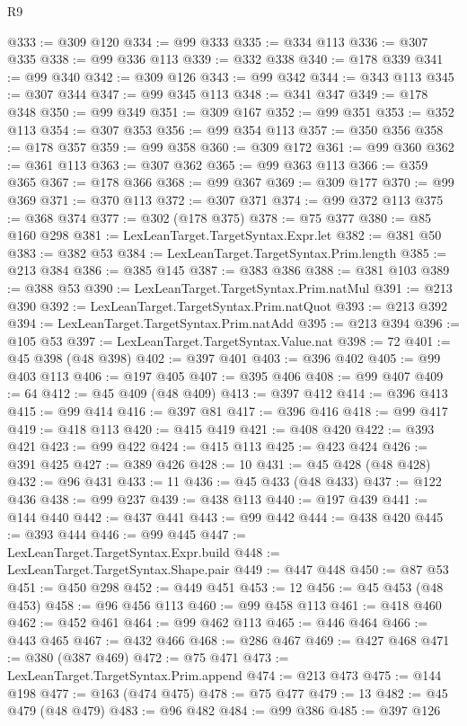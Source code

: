 \begin{lexlean}{R9}
\begin{coremodule}
{{{{{{{{{{{{{{{{{{{{{{{{{{{{{{{{{{{{{{{{{{{{{{{{{{{{{{{{{{{{{{{{{{{{{{{{{{{{{{{{{{{{@333 := @309 @120
@334 := @99 @333
@335 := @334 @113
@336 := @307 @335
@338 := @99 @336 @113
@339 := @332 @338
@340 := @178 @339
@341 := @99 @340
@342 := @309 @126
@343 := @99 @342
@344 := @343 @113
@345 := @307 @344
@347 := @99 @345 @113
@348 := @341 @347
@349 := @178 @348
@350 := @99 @349
@351 := @309 @167
@352 := @99 @351
@353 := @352 @113
@354 := @307 @353
@356 := @99 @354 @113
@357 := @350 @356
@358 := @178 @357
@359 := @99 @358
@360 := @309 @172
@361 := @99 @360
@362 := @361 @113
@363 := @307 @362
@365 := @99 @363 @113
@366 := @359 @365
@367 := @178 @366
@368 := @99 @367
@369 := @309 @177
@370 := @99 @369
@371 := @370 @113
@372 := @307 @371
@374 := @99 @372 @113
@375 := @368 @374
@377 := @302 (@178 @375)
@378 := @75 @377
@380 := @85 @160 @298
@381 := LexLeanTarget.TargetSyntax.Expr.let
@382 := @381 @50
@383 := @382 @53
@384 := LexLeanTarget.TargetSyntax.Prim.length
@385 := @213 @384
@386 := @385 @145
@387 := @383 @386
@388 := @381 @103
@389 := @388 @53
@390 := LexLeanTarget.TargetSyntax.Prim.natMul
@391 := @213 @390
@392 := LexLeanTarget.TargetSyntax.Prim.natQuot
@393 := @213 @392
@394 := LexLeanTarget.TargetSyntax.Prim.natAdd
@395 := @213 @394
@396 := @105 @53
@397 := LexLeanTarget.TargetSyntax.Value.nat
@398 := 72
@401 := @45 @398 (@48 @398)
@402 := @397 @401
@403 := @396 @402
@405 := @99 @403 @113
@406 := @197 @405
@407 := @395 @406
@408 := @99 @407
@409 := 64
@412 := @45 @409 (@48 @409)
@413 := @397 @412
@414 := @396 @413
@415 := @99 @414
@416 := @397 @81
@417 := @396 @416
@418 := @99 @417
@419 := @418 @113
@420 := @415 @419
@421 := @408 @420
@422 := @393 @421
@423 := @99 @422
@424 := @415 @113
@425 := @423 @424
@426 := @391 @425
@427 := @389 @426
@428 := 10
@431 := @45 @428 (@48 @428)
@432 := @96 @431
@433 := 11
@436 := @45 @433 (@48 @433)
@437 := @122 @436
@438 := @99 @237
@439 := @438 @113
@440 := @197 @439
@441 := @144 @440
@442 := @437 @441
@443 := @99 @442
@444 := @438 @420
@445 := @393 @444
@446 := @99 @445
@447 := LexLeanTarget.TargetSyntax.Expr.build
@448 := LexLeanTarget.TargetSyntax.Shape.pair
@449 := @447 @448
@450 := @87 @53
@451 := @450 @298
@452 := @449 @451
@453 := 12
@456 := @45 @453 (@48 @453)
@458 := @96 @456 @113
@460 := @99 @458 @113
@461 := @418 @460
@462 := @452 @461
@464 := @99 @462 @113
@465 := @446 @464
@466 := @443 @465
@467 := @432 @466
@468 := @286 @467
@469 := @427 @468
@471 := @380 (@387 @469)
@472 := @75 @471
@473 := LexLeanTarget.TargetSyntax.Prim.append
@474 := @213 @473
@475 := @144 @198
@477 := @163 (@474 @475)
@478 := @75 @477
@479 := 13
@482 := @45 @479 (@48 @479)
@483 := @96 @482
@484 := @99 @386
@485 := @397 @126
}}}}}}}}}}}}}}}}}}}}}}}}}}}}}}}}}}}}}}}}}}}}}}}}}}}}}}}}}}}}}}}}}}}}}}}}}}}}}}}}}}}}
\end{coremodule}
\end{lexlean}
